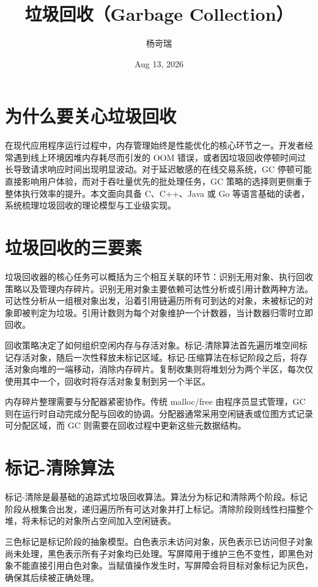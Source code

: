 \title{垃圾回收（Garbage Collection）}
\author{杨岢瑞}
\date{Aug 13, 2026}
\maketitle
\chapter{为什么要关心垃圾回收}
在现代应用程序运行过程中，内存管理始终是性能优化的核心环节之一。开发者经常遇到线上环境因堆内存耗尽而引发的 OOM 错误，或者因垃圾回收停顿时间过长导致请求响应时间出现明显波动。对于延迟敏感的在线交易系统，GC 停顿可能直接影响用户体验，而对于吞吐量优先的批处理任务，GC 策略的选择则更侧重于整体执行效率的提升。本文面向具备 C、C++、Java 或 Go 等语言基础的读者，系统梳理垃圾回收的理论模型与工业级实现。\par
\chapter{垃圾回收的三要素}
垃圾回收器的核心任务可以概括为三个相互关联的环节：识别无用对象、执行回收策略以及管理内存碎片。识别无用对象主要依赖可达性分析或引用计数两种方法。可达性分析从一组根对象出发，沿着引用链遍历所有可到达的对象，未被标记的对象即被判定为垃圾。引用计数则为每个对象维护一个计数器，当计数器归零时立即回收。\par
回收策略决定了如何组织空闲内存与存活对象。标记-清除算法首先遍历堆空间标记存活对象，随后一次性释放未标记区域。标记-压缩算法在标记阶段之后，将存活对象向堆的一端移动，消除内存碎片。复制收集则将堆划分为两个半区，每次仅使用其中一个，回收时将存活对象复制到另一个半区。\par
内存碎片整理需要与分配器紧密协作。传统 malloc/free 由程序员显式管理，GC 则在运行时自动完成分配与回收的协调。分配器通常采用空闲链表或位图方式记录可分配区域，而 GC 则需要在回收过程中更新这些元数据结构。\par
\chapter{标记-清除算法}
标记-清除是最基础的追踪式垃圾回收算法。算法分为标记和清除两个阶段。标记阶段从根集合出发，递归遍历所有可达对象并打上标记。清除阶段则线性扫描整个堆，将未标记的对象所占空间加入空闲链表。\par
三色标记是标记阶段的抽象模型。白色表示未访问对象，灰色表示已访问但子对象尚未处理，黑色表示所有子对象均已处理。写屏障用于维护三色不变性，即黑色对象不能直接引用白色对象。当赋值操作发生时，写屏障会将目标对象标记为灰色，确保其后续被正确处理。\par
